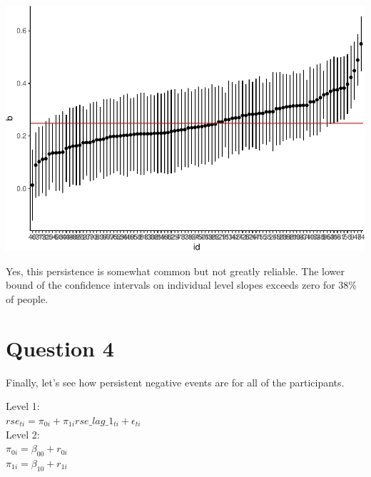 \documentclass[]{article}
\newenvironment{Shaded}{\begin{snugshade}}{\end{snugshade}}
\newcommand{\KeywordTok}[1]{\textcolor[rgb]{0.13,0.29,0.53}{\textbf{#1}}}
\newcommand{\DataTypeTok}[1]{\textcolor[rgb]{0.13,0.29,0.53}{#1}}
\newcommand{\FloatTok}[1]{\textcolor[rgb]{0.00,0.00,0.81}{#1}}
\newcommand{\StringTok}[1]{\textcolor[rgb]{0.31,0.60,0.02}{#1}}
\newcommand{\OperatorTok}[1]{\textcolor[rgb]{0.81,0.36,0.00}{\textbf{#1}}}
\newcommand{\NormalTok}[1]{#1}
\begin{document}
\includegraphics{Beck_HW_7_R_1_files/figure-latex/unnamed-chunk-6-1.pdf}

\begin{Shaded}
\end{Shaded}

Yes, this persistence is somewhat common but not greatly reliable. The
lower bound of the confidence intervals on individual level slopes
exceeds zero for 38\% of people.

\section{Question 4}\label{question-4}

Finally, let's see how persistent negative events are for all of the
participants.

Level 1:\\
\(rse_{ti} = \pi_{0i} + \pi_{1i}rse\_lag\_1_{ti} + \epsilon_{ti}\)\\
Level 2:\\
\(\pi_{0i} = \beta_{00} + r_{0i}\)\\
\(\pi_{1i} = \beta_{10} + r_{1i}\)
\end{document}
